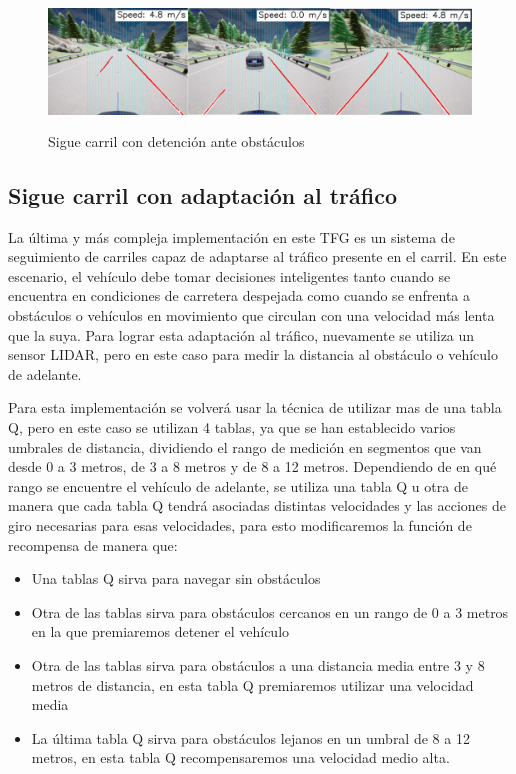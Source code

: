   \begin{figure}[h]
    \centering
    \includegraphics[height=3.5cm]{imagenes/cap4/demostraciones_qlearning/obstacle/demostracion_sigue_carriles.pdf}
    \caption{Sigue carril con detención ante obstáculos}
    \label{fig:Sigue carriles con deteción ante obstáculos basado en Qlearning}
\end{figure}

\subsection{Sigue carril con adaptación al tráfico}
\label{Sigue carril con adaptación al tráfico}

La última y más compleja implementación en este \ac{TFG} es un sistema de seguimiento de carriles capaz de adaptarse al tráfico presente en el carril. En este escenario, el vehículo debe tomar decisiones inteligentes tanto cuando se encuentra en condiciones de carretera despejada como cuando se enfrenta a obstáculos o vehículos en movimiento que circulan con una velocidad más lenta que la suya. Para lograr esta adaptación al tráfico, nuevamente se utiliza un sensor LIDAR, pero en este caso para medir la distancia al obstáculo o vehículo de adelante.

Para esta implementación se volverá usar la técnica de utilizar mas de una tabla Q, pero en este caso se utilizan 4 tablas, ya que se han establecido varios umbrales de distancia, dividiendo el rango de medición en segmentos que van desde 0 a 3 metros, de 3 a 8 metros y de 8 a 12 metros. Dependiendo de en qué rango se encuentre el vehículo de adelante, se utiliza una tabla Q u otra de manera que cada tabla Q tendrá asociadas distintas velocidades y las acciones de giro necesarias para esas velocidades, para esto modificaremos la función de recompensa de manera que:

\begin{itemize}
	\item Una tablas Q sirva para navegar sin obstáculos
	\item Otra de las tablas sirva para obstáculos cercanos en un rango de 0 a 3 metros en la que premiaremos detener el vehículo
	\item Otra de las tablas sirva para obstáculos a una distancia media entre 3 y 8 metros de distancia, en esta tabla Q premiaremos utilizar una velocidad media
	\item La última tabla Q sirva para obstáculos lejanos en un umbral de 8 a 12 metros, en esta tabla Q recompensaremos una velocidad medio alta.
   
\end{itemize}


